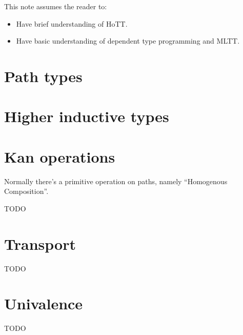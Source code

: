 \documentclass{article}
\newcommand{\TODO}[0]{{\color{red} TODO}}
\begin{document}
This note assumes the reader to:

\begin{itemize}
\item Have brief understanding of HoTT.
\item Have basic understanding of dependent type programming and MLTT.
\end{itemize}

\section{Path types}
\label{sec:path}


\section{Higher inductive types}
\label{sec:hit}


\section{Kan operations}
\label{sec:kan}

Normally there's a primitive operation on paths,
namely ``Homogenous Composition''.

\TODO

\section{Transport}
\label{sec:coe}

\TODO

\section{Univalence}
\label{sec:ua}

\TODO



\end{document}
